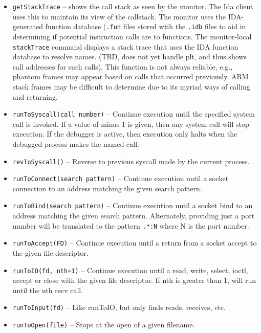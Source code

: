 \documentclass[titlepage]{article}
\begin{document}
\begin{itemize}
\item {\tt getStackTrace} – shows the call stack as seen by the monitor.  The Ida client uses this to maintain its view of the callstack.  The monitor
uses the IDA-generated function database ({\tt .fun} files stored wtih the {\tt .idb} files to aid in determining if 
potential instruction calls are to functions.  The monitor-local {\tt stackTrace} command displays a
stack trace that uses the IDA function database to resolve names.  (TBD, does not yet handle plt, and thus shows call addresses for such calls).
This function is not always reliable, e.g., phantom frames may appear based on calls that occurred previously. ARM stack frames may be
difficult to determine due to its myriad ways of calling and returning. 

\item {\tt runToSyscall(call number)} – Continue execution until the specified system call is invoked.  If a value of minus 1 is given, then any system call will stop execution.  If the debugger is active, then execution only halts when the debugged process makes the named call.

\item {\tt revToSyscall()} -- Reverse to previous syscall made by the current process.

\item {\tt runToConnect(search pattern)} – Continue execution until a socket connection to an address matching the given search pattern.

\item {\tt runToBind(search pattern)} – Continue execution until a socket bind to an address matching the given search pattern.  Alternately, providing just
a port number will be translated to the pattern {\tt .*:N} where N is the port number.

\item {\tt runToAccept(FD)} – Continue execution until a return from a socket accept to the given file descriptor.

\item {\tt runToIO(fd, nth=1)} – Continue execution until a read, write, select, ioctl, accept or close with the given file descriptor.  
If nth is greater than 1, will run until the nth recv call.  

\item {\tt runToInput(fd)} -- Like runToIO, but only finds reads, receives, etc.

\item {\tt runToOpen(file)} -- Stops at the open of a given filename.


\end{itemize}
\end{document}
